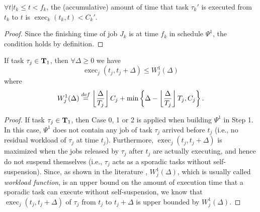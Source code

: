 \begin{Lemma}
  \label{lemma:exec-tau-k}
  $\forall t | t_k \leq t < f_k$, the (accumulative) amount of time that
  task $\tau_k'$ is executed from $t_k$ to $t$ is $\operatorname{exec}_k(t_k, t) < C_k'$.
\end{Lemma}
\begin{proof}
  Since the finishing time of job $J_k$ is at time $f_k$ in schedule $\Psi^1$, the
  condition holds by definition.
\end{proof}

\begin{Lemma}
\label{lemma:Wj1-exact}
If task $\tau_j \in {\bf T}_1$, then $\forall \Delta \geq 0$ we have 
\[
\operatorname{exec}_j(t_j, t_j+\Delta) \leq W_j^1(\Delta)
\]
where
{\footnotesize \begin{equation}
  \label{eq:execution-case1}
  W_j^1(\Delta) \stackrel{\mbox{def}}{=} \floor{\frac{\Delta}{T_j}}C_j + \min\left\{\Delta-\floor{\frac{\Delta}{T_j}}T_j, C_j\right\}.
\end{equation}}
\end{Lemma}
\begin{proof}
If task $\tau_j \in {\bf T}_1$, then Case 0, 1 or 2 is applied when building $\Psi^1$ in Step 1. %
  In this case, $\Psi^1$ does not contain any job of task $\tau_j$
  arrived before $t_j$ (i.e., no residual workload of $\tau_j$ at time $t_j$). Furthermore, $\operatorname{exec}_j(t_j, t_j+\Delta)$ is maximized when the jobs released by $\tau_j$ after $t_j$ are actually executing, and hence do not suspend themselves (i.e., $\tau_j$ acts as a sporadic tasks without self-suspension). Since, as shown in the literature \cite{bertogna2006new}, $W_j^1(\Delta)$, which is usually called \emph{workload function}, is an upper bound on the amount of execution time that a sporadic task can execute without self-suspension, we know that $\operatorname{exec}_j(t_j, t_j+\Delta)$ of $\tau_j$ from $t_j$ to $t_j+\Delta$ is upper bounded by $W_j^1(\Delta)$.
\end{proof}

